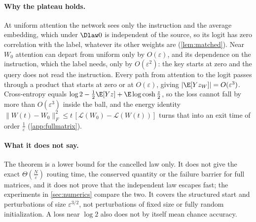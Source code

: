 \paragraph{Why the plateau holds.} At uniform attention the network sees only the instruction and the average embedding, which under $\Dlaw0$ is independent of the source, so
its logit has zero correlation with the label, whatever its other weights are (\cref{lem:matched}). Near $W_0$ attention can depart from uniform only by $O(\varepsilon)$,
and its dependence on the instruction, which the label needs, only by $O(\varepsilon^2)$: the key starts at zero and the query does not read the instruction.
Every path from attention to the logit passes through a product that starts at zero or at $O(\varepsilon)$, giving $|\E[Yz_W]|=O(\varepsilon^3)$.
Cross-entropy equals $\log2-\tfrac12\E[Yz]+\E\log\cosh\tfrac{z}{2}$, so the loss cannot fall by more than $O(\varepsilon^3)$ inside the ball, and the energy identity
$\|W(t)-W_0\|_F^2\le t\,[\mathcal L(W_0)-\mathcal L(W(t))]$ turns that into an exit time of order $\tfrac{1}{\varepsilon}$ (\cref{app:fullmatrix}).

\paragraph{What it does not say.} The theorem is a lower bound for the cancelled law only. It does not give the exact $\Theta(\tfrac{N}{\varepsilon})$ routing time,
the conserved quantity or the failure barrier for full matrices, and it does not prove that the independent law escapes fast; the
experiments in \cref{sec:numerics} compare the two. It covers the structured start and perturbations of size $\varepsilon^{3/2}$, not perturbations of fixed size
or fully random initialization. A loss near $\log2$ also does not by itself mean chance accuracy.

